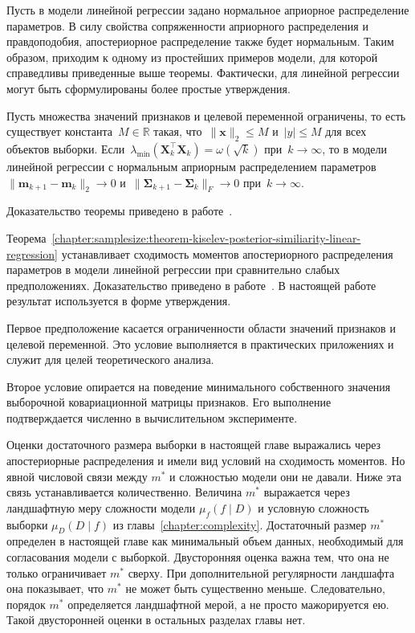 Пусть в модели линейной регрессии задано нормальное априорное распределение параметров. В силу свойства сопряженности априорного распределения и правдоподобия, апостериорное распределение также будет нормальным.
Таким образом, приходим к одному из простейших примеров модели, для которой справедливы приведенные выше теоремы.
Фактически, для линейной регрессии могут быть сформулированы более простые утверждения.

\begin{theorem}\label{chapter:samplesize:theorem-kiselev-posterior-similiarity-linear-regression}
    Пусть множества значений признаков и целевой переменной ограничены, то есть существует константа~$M\in \mathbb{R}$ такая, что~$\|\mathbf{x}\|_2\leqslant M$ и~$|y|\leqslant M$ для всех объектов выборки.
    Если~$\lambda_{\min}\left(\mathbf{X}^{\top}_k \mathbf{X}_k \right) = \omega(\sqrt{k})$ при~$k\to \infty$, то в модели линейной регрессии с нормальным априорным распределением параметров~$\|\mathbf{m}_{k+1} - \mathbf{m}_k\|_2\to 0$ и~$\|\mathbf{\Sigma}_{k+1} - \mathbf{\Sigma}_k\|_{F}\to 0$ при~$k\to \infty$.
\end{theorem}
Доказательство теоремы приведено в работе~\cite{grabovoi2025sample727559461}.

Теорема~\ref{chapter:samplesize:theorem-kiselev-posterior-similiarity-linear-regression} устанавливает сходимость моментов апостериорного распределения параметров в модели линейной регрессии при сравнительно слабых предположениях. Доказательство приведено в работе~\cite{grabovoi2025sample727559461}. В настоящей работе результат используется в форме утверждения.

Первое предположение касается ограниченности области значений признаков и целевой переменной. Это условие выполняется в практических приложениях и служит для целей теоретического анализа.

Второе условие опирается на поведение минимального собственного значения выборочной ковариационной матрицы признаков. Его выполнение подтверждается численно в вычислительном эксперименте.

Оценки достаточного размера выборки в настоящей главе выражались через апостериорные распределения и имели вид условий на сходимость моментов.
Но явной числовой связи между $m^*$ и сложностью модели они не давали.
Ниже эта связь устанавливается количественно.
Величина $m^*$ выражается через ландшафтную меру сложности модели $\mu_f(f\mid D)$ и условную сложность выборки $\mu_D(D\mid f)$ из главы~\ref{chapter:complexity}.
Достаточный размер $m^*$ определен в настоящей главе как минимальный объем данных, необходимый для согласования модели с выборкой.
Двусторонняя оценка важна тем, что она не только ограничивает $m^*$ сверху.
При дополнительной регулярности ландшафта она показывает, что $m^*$ не может быть существенно меньше.
Следовательно, порядок $m^*$ определяется ландшафтной мерой, а не просто мажорируется ею.
Такой двусторонней оценки в остальных разделах главы нет.

